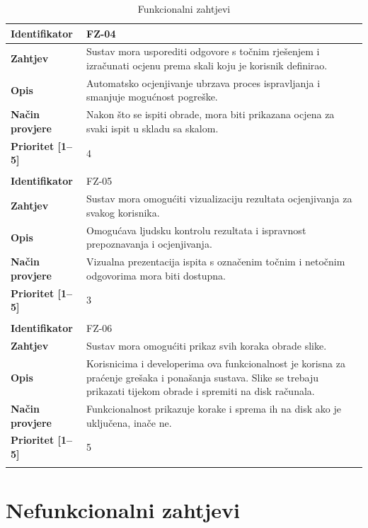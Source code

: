 \documentclass{foi}
\begin{document}
\begin{longtable}{|l|p{12cm}|}
    \textbf{Identifikator} & FZ-04 \\ \hline
    \textbf{Zahtjev} & Sustav mora usporediti odgovore s točnim rješenjem i izračunati ocjenu prema skali koju je korisnik definirao. \\ \hline
    \textbf{Opis} & Automatsko ocjenjivanje ubrzava proces ispravljanja i smanjuje mogućnost pogreške. \\ \hline
    \textbf{Način provjere} & Nakon što se ispiti obrade, mora biti prikazana ocjena za svaki ispit u skladu sa skalom. \\ \hline
    \textbf{Prioritet [1--5]} & 4 \\ \hline
    \multicolumn{2}{|c|}{} \\ \hline
    \pagebreak
    \hline

    \textbf{Identifikator} & FZ-05 \\ \hline
    \textbf{Zahtjev} & Sustav mora omogućiti vizualizaciju rezultata ocjenjivanja za svakog korisnika. \\ \hline
    \textbf{Opis} & Omogućava ljudsku kontrolu rezultata i ispravnost prepoznavanja i ocjenjivanja. \\ \hline
    \textbf{Način provjere} & Vizualna prezentacija ispita s označenim točnim i netočnim odgovorima mora biti dostupna. \\ \hline
    \textbf{Prioritet [1--5]} & 3 \\ \hline
    \multicolumn{2}{|c|}{} \\ \hline
    
    \textbf{Identifikator} & FZ-06 \\ \hline
    \textbf{Zahtjev} & Sustav mora omogućiti prikaz svih koraka obrade slike. \\ \hline
    \textbf{Opis} & Korisnicima i developerima ova funkcionalnost je korisna za praćenje grešaka i ponašanja sustava. Slike se trebaju prikazati tijekom obrade i spremiti na disk računala. \\ \hline
    \textbf{Način provjere} & Funkcionalnost prikazuje korake i sprema ih na disk ako je uključena, inače ne. \\ \hline
    \textbf{Prioritet [1--5]} & 5  \\ \hline
        
    \caption{Funkcionalni zahtjevi}
\end{longtable}

\section{Nefunkcionalni zahtjevi}
\end{document}
